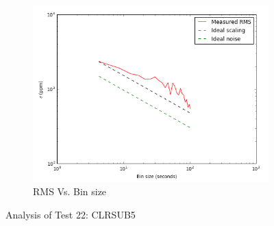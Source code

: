 \documentclass[conference]{IEEEtran}
\begin{document}
\begin{figure}[H]
    \begin{subfigure}{3}
        \includegraphics[scale=0.6]{rms_test22}
        \caption{RMS Vs. Bin size}
    \end{subfigure}
    \caption{Analysis of Test 22: CLRSUB5}
\end{figure}
\end{document}
